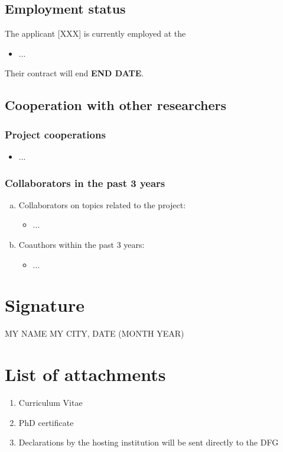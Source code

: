 \documentclass[a4paper,10pt,oneside]{article}
\begin{document}
\subsection{Employment status}

The applicant [XXX] is currently employed at the
\begin{itemize}
  \item ...
\end{itemize}
Their contract will end {\bf END DATE}.

\subsection{Cooperation with other researchers}

\subsubsection{Project cooperations}

\begin{itemize}
  \item ...
\end{itemize}

\subsubsection{Collaborators in the past 3 years}

\begin{enumerate}[(a)]
  \item Collaborators on topics related to the project:
  \begin{itemize}
    \item ...
  \end{itemize}
  \item Coauthors within the past 3 years:
  \begin{itemize}
    \item ...
  \end{itemize}
\end{enumerate}

\section{Signature}

\hspace*{75pt} MY NAME \hfill MY CITY, DATE (MONTH YEAR)

\section{List of attachments}

\begin{enumerate}
  \item Curriculum Vitae
  \item PhD certificate
  \item Declarations by the hosting institution will be sent directly to the DFG
\end{enumerate}

\vfill
\end{document}
